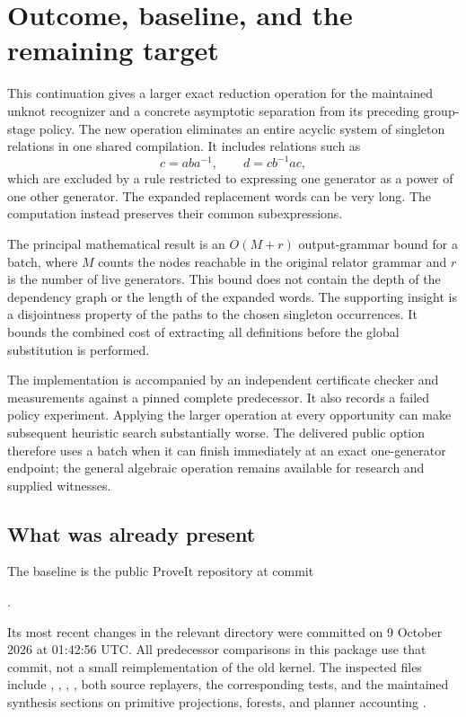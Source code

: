 \section{Outcome, baseline, and the remaining target}
\label{sec:context}

This continuation gives a larger exact reduction operation for the maintained
unknot recognizer and a concrete asymptotic separation from its preceding
group-stage policy. The new operation eliminates an entire acyclic system of
singleton relations in one shared compilation. It includes relations such as
\[
 c=a b a^{-1},\qquad d=c b^{-1} a c,
\]
which are excluded by a rule restricted to expressing one generator as a
power of one other generator. The expanded replacement words can be very
long. The computation instead preserves their common subexpressions.

The principal mathematical result is an $O(M+r)$ output-grammar bound for a
batch, where $M$ counts the nodes reachable in the original relator grammar
and $r$ is the number of live generators. This bound does not contain the
depth of the dependency graph or the length of the expanded words. The
supporting insight is a disjointness property of the paths to the chosen
singleton occurrences. It bounds the combined cost of extracting all
definitions before the global substitution is performed.

The implementation is accompanied by an independent certificate checker and
measurements against a pinned complete predecessor. It also records a failed
policy experiment. Applying the larger operation at every opportunity can
make subsequent heuristic search substantially worse. The delivered public
option therefore uses a batch when it can finish immediately at an exact
one-generator endpoint; the general algebraic operation remains available
for research and supplied witnesses.

\subsection{What was already present}

The baseline is the public ProveIt repository at commit
\begin{center}\baselinecommit.\end{center}
Its most recent changes in the relevant directory were committed on
9 October 2026 at 01:42:56 UTC.
All predecessor comparisons in this package use that commit, not a small
reimplementation of the old kernel. The inspected files include
, ,
, , both source
replayers, the corresponding tests, and the maintained synthesis sections
on primitive projections, forests, and planner accounting
\cite{ProveIt2026}.

